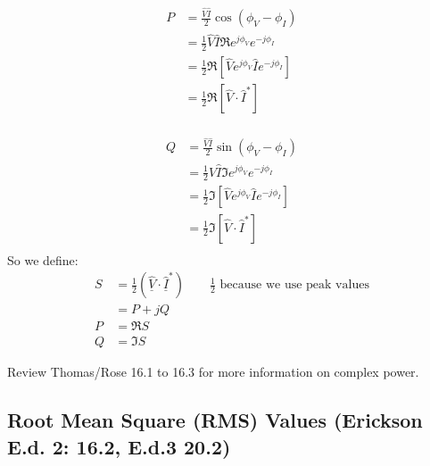\begin{definition}
    \begin{align}
        P & = \frac{\hat{V}\hat{I}}{2}\cos(\phi_{V} - \phi_{I})           \\
          & = \frac{1}{2}\hat{V}\hat{I}\Re{e^{j\phi_{V}}e^{-j\phi_{I}}}   \\
          & = \frac{1}{2}\Re{[\hat{V}e^{j\phi_{V}}\hat{I}e^{-j\phi_{I}}]} \\
          & = \frac{1}{2}\Re[{\hat{V}\cdot \hat{I}^{*}}]                  \\
    \end{align}

    \begin{align}
        Q & = \frac{\hat{V}\hat{I}}{2}\sin(\phi_{V} - \phi_{I})           \\
          & = \frac{1}{2}\hat{V}\hat{I}\Im{e^{j\phi_{V}}e^{-j\phi_{I}}}   \\
          & = \frac{1}{2}\Im{[\hat{V}e^{j\phi_{V}}\hat{I}e^{-j\phi_{I}}]} \\
          & = \frac{1}{2}\Im[{\hat{V}\cdot \hat{I}^{*}}]                  \\
    \end{align}
    So we define:
    \begin{align}
        S & = \frac{1}{2}(\hat{\underline{V}}\cdot \hat{\underline{I}}^{*}) \qquad \frac{1}{2}\text{ because we use peak values} \\
          & = P + jQ                                                                                                             \\
        P & = \Re{S}                                                                                                             \\
        Q & = \Im{S}
    \end{align}
\end{definition}

\begin{remark}
    Review Thomas/Rose 16.1 to 16.3 for more information on complex power.
\end{remark}

\subsection{Root Mean Square (RMS) Values (Erickson E.d. 2: 16.2, E.d.3 20.2)}

